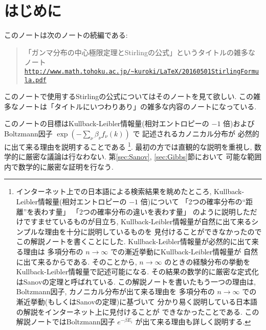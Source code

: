 \documentclass[12pt,twoside]{jarticle}
\theoremstyle{definition} %
\theoremstyle{definition} %
\theoremstyle{definition} %
\numberwithin{theorem}{section}
\numberwithin{equation}{section}
\numberwithin{figure}{section}
\numberwithin{table}{section}
\begin{document}
\title{\TITLE}
\author{\AUTHOR}
\date{\DATE}
\maketitle
\tableofcontents
\setcounter{section}{-1} %

\section{はじめに}

このノートは次のノートの続編である:
\begin{quote}
「ガンマ分布の中心極限定理とStirlingの公式」というタイトルの雑多なノート
\\
\href{http://www.math.tohoku.ac.jp/~kuroki/LaTeX/20160501StirlingFormula.pdf}
{\tt http://www.math.tohoku.ac.jp/{\textasciitilde}kuroki/LaTeX/20160501StirlingFormula.pdf}
\end{quote}
このノートで使用するStirlingの公式についてはそのノートを見て欲しい.
この雑多なノートは「タイトルにいつわりあり」の雑多な内容のノートになっている.

このノートの目標はKullback-Leibler情報量(相対エントロピーの $-1$ 倍)および
Boltzmann因子 $\exp(-\sum_\nu \beta_\nu f_{\nu}(k))$ で
記述されるカノニカル分布が
必然的に出て来る理由を説明することである%
\footnote{インターネット上での日本語による検索結果を眺めたところ, 
Kullback-Leibler情報量(相対エントロピーの $-1$ 倍)について
「2つの確率分布の``距離''を表わす量」
「2つの確率分布の違いを表わす量」
のように説明しただけですませているものが目立ち, 
Kullback-Leibler情報量が自然に出て来るシンプルな理由を十分に説明しているものを
見付けることができなかったのでこの解説ノートを書くことにした.
Kullback-Leibler情報量が必然的に出て来る理由は
多項分布の $n\to\infty$ での漸近挙動にKullback-Leibler情報量が
自然に出て来るからである.
そのことから, $n\to\infty$ のときの経験分布の挙動を
Kullback-Leibler情報量で記述可能になる.
その結果の数学的に厳密な定式化はSanovの定理と呼ばれている.
この解説ノートを書いたもう一つの理由は, 
Boltzmann因子, カノニカル分布が出て来る理由を
多項分布の $n\to\infty$ での漸近挙動(もしくはSanovの定理)に基づいて
分かり易く説明している日本語の解説をインターネット上に見付けることが
できなかったことである. 
この解説ノートではBoltzmann因子 $e^{-\beta E_i}$ が出て来る理由も詳しく説明する.}.
最初の方では直観的な説明を重視し, 数学的に厳密な議論は行なわない.
第\ref{sec:Sanov}, \ref{sec:Gibbs}節において
可能な範囲内で数学的に厳密な証明を行なう.
\end{document}
